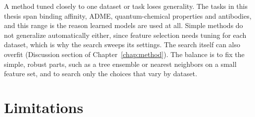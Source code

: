 A method tuned closely to one dataset or task loses generality. The tasks in this thesis span binding affinity, ADME, quantum-chemical properties and antibodies, and this range is the reason learned models are used at all. Simple methods do not generalize automatically either, since feature selection needs tuning for each dataset, which is why the search sweeps its settings. The search itself can also overfit (Discussion section of Chapter~\ref{chap:method}). The balance is to fix the simple, robust parts, such as a tree ensemble or nearest neighbors on a small feature set, and to search only the choices that vary by dataset.



\section{Limitations}

